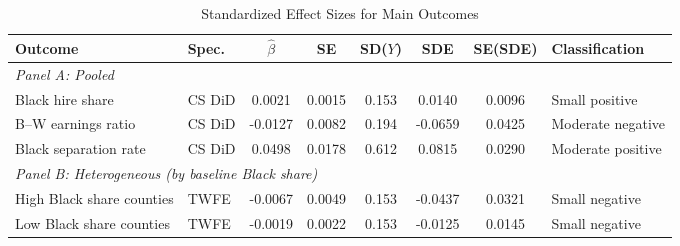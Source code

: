 
\begin{table}[H]
\centering
\caption{Standardized Effect Sizes for Main Outcomes}
\label{tab:sde}
\begin{adjustbox}{max width=\textwidth}
\begin{threeparttable}
\begin{tabular}{llcccccl}
\toprule
Outcome & Spec. & $\hat{\beta}$ & SE & SD($Y$) & SDE & SE(SDE) & Classification \\
\midrule
\multicolumn{8}{l}{\textit{Panel A: Pooled}} \\
Black hire share & CS DiD & 0.0021 & 0.0015 & 0.153 & 0.0140 & 0.0096 & Small positive \\
B--W earnings ratio & CS DiD & -0.0127 & 0.0082 & 0.194 & -0.0659 & 0.0425 & Moderate negative \\
Black separation rate & CS DiD & 0.0498 & 0.0178 & 0.612 & 0.0815 & 0.0290 & Moderate positive \\
\midrule
\multicolumn{8}{l}{\textit{Panel B: Heterogeneous (by baseline Black share)}} \\
High Black share counties & TWFE & -0.0067 & 0.0049 & 0.153 & -0.0437 & 0.0321 & Small negative \\
Low Black share counties & TWFE & -0.0019 & 0.0022 & 0.153 & -0.0125 & 0.0145 & Small negative \\
\bottomrule
\end{tabular}
\begin{tablenotes}[flushleft]
\small

\end{tablenotes}
\end{threeparttable}
\end{adjustbox}
\end{table}
